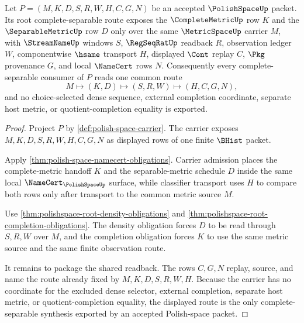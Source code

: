 \begin{theorem}
\label{thm:polish-space-root-complete-separable-synthesis}
Let $P=(M,K,D,S,R,W,H,C,G,N)$ be an accepted $\PolishSpaceUp$ packet. Its
root complete-separable route exposes the $\CompleteMetricUp$ row $K$ and
the $\SeparableMetricUp$ row $D$ only over the same $\MetricSpaceUp$ carrier
$M$, with $\StreamNameUp$ windows $S$, $\RegSeqRatUp$ readback $R$,
observation ledger $W$, componentwise $\hsame$ transport $H$, displayed
$\Cont$ replay $C$, $\Pkg$ provenance $G$, and local $\NameCert$ rows $N$.
Consequently every complete-separable consumer of $P$ reads one common route
$$
M \longmapsto (K,D) \longmapsto (S,R,W) \longmapsto (H,C,G,N),
$$
and no choice-selected dense sequence, external completion coordinate,
separate host metric, or quotient-completion equality is exported.
\end{theorem}
\begin{proof}
Project $P$ by \autoref{def:polish-space-carrier}. The carrier exposes
$M,K,D,S,R,W,H,C,G,N$ as displayed rows of one finite $\BHist$ packet.

Apply \autoref{thm:polish-space-namecert-obligations}. Carrier admission
places the complete-metric handoff $K$ and the separable-metric schedule $D$
inside the same local $\NameCert_{\PolishSpaceUp}$ surface, while classifier
transport uses $H$ to compare both rows only after transport to the common
metric source $M$.

Use \autoref{thm:polishspace-root-density-obligations} and
\autoref{thm:polishspace-root-completion-obligations}. The density obligation
forces $D$ to be read through $S,R,W$ over $M$, and the completion obligation
forces $K$ to use the same metric source and the same finite observation
route.

It remains to package the shared readback. The rows $C,G,N$ replay, source,
and name the route already fixed by $M,K,D,S,R,W,H$. Because the carrier has
no coordinate for the excluded dense selector, external completion, separate
host metric, or quotient-completion equality, the displayed route is the only
complete-separable synthesis exported by an accepted Polish-space packet.
\end{proof}

